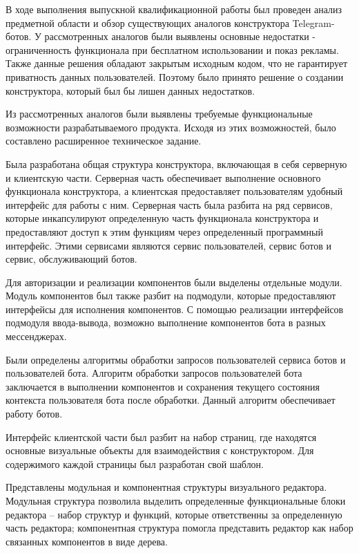 \newpage


В ходе выполнения выпускной квалификационной работы был проведен анализ
предметной области и обзор существующих аналогов конструктора
Telegram-ботов. У рассмотренных аналогов были выявлены основные
недостатки - ограниченность функционала при бесплатном использовании
и показ рекламы. Также данные решения обладают закрытым исходным кодом,
что не гарантирует приватность данных пользователей.
Поэтому было принято решение о создании конструктора, который был бы лишен
данных недостатков.

Из рассмотренных аналогов были выявлены требуемые функциональные
возможности разрабатываемого продукта.
Исходя из этих возможностей, было составлено расширенное техническое задание.

Была разработана общая структура конструктора, включающая в себя
серверную и клиентскую части. Серверная часть обеспечивает выполнение
основного функционала конструктора, а клиентская предоставляет
пользователям удобный интерфейс для работы с ним.
Серверная часть была разбита на ряд сервисов, которые инкапсулируют
определенную часть функционала конструктора и предоставляют доступ
к этим функциям через определенный программный интерфейс.
Этими сервисами являются сервис пользователей,
сервис ботов и сервис, обслуживающий ботов.

Для авторизации и реализации компонентов были выделены отдельные
модули. Модуль компонентов был также разбит на подмодули, которые
предоставляют интерфейсы для исполнения компонентов.
С помощью реализации интерфейсов подмодуля ввода-вывода, возможно выполнение
компонентов бота в разных мессенджерах.

Были определены алгоритмы обработки запросов пользователей сервиса ботов
и пользователей бота.
Алгоритм обработки запросов пользователей бота
заключается в выполнении компонентов и сохранения текущего
состояния контекста пользователя бота после обработки. Данный алгоритм
обеспечивает работу ботов.

Интерфейс клиентской части был разбит на набор страниц, где
находятся основные визуальные объекты для взаимодействия с конструктором.
Для содержимого каждой страницы был разработан свой шаблон.

Представлены модульная и компонентная структуры визуального
редактора. Модульная структура позволила выделить определенные
функциональные блоки редактора – набор структур и функций, которые
ответственны за определенную часть редактора; компонентная структура
помогла представить редактор как набор связанных компонентов в виде
дерева.


